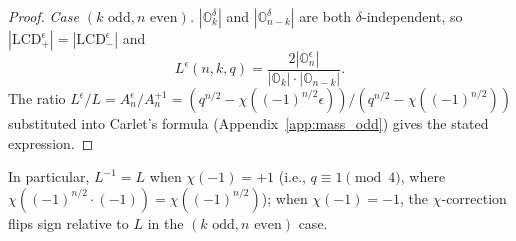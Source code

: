 \documentclass[11pt]{article}
\newcommand{\0}{\mathbf{0}}
\newcommand{\1}{\mathbf{1}}
\theoremstyle{plain}
\theoremstyle{definition}
\theoremstyle{remark}
\begin{document}
\begin{proof}
\emph{Case $(k\text{ odd}, n\text{ even})$.} $|\mathbb{O}_k^\delta|$ and $|\mathbb{O}_{n-k}^\delta|$ are both $\delta$-independent, so $|\mathrm{LCD}^\epsilon_+| = |\mathrm{LCD}^\epsilon_-|$ and
\[
L^\epsilon(n, k, q) = \frac{2|\mathbb{O}_n^\epsilon|}{|\mathbb{O}_k| \cdot |\mathbb{O}_{n-k}|}.
\]
The ratio $L^\epsilon/L = A_n^\epsilon/A_n^{+1} = (q^{n/2} - \chi((-1)^{n/2}\epsilon))/(q^{n/2} - \chi((-1)^{n/2}))$ substituted into Carlet's formula (Appendix~\ref{app:mass_odd}) gives the stated expression.
\end{proof}

In particular, $L^{-1} = L$ when $\chi(-1) = +1$ (i.e., $q \equiv 1 \pmod 4$, where $\chi((-1)^{n/2}\cdot(-1)) = \chi((-1)^{n/2})$); when $\chi(-1) = -1$, the $\chi$-correction flips sign relative to $L$ in the $(k\text{ odd}, n\text{ even})$ case.



\end{document}
